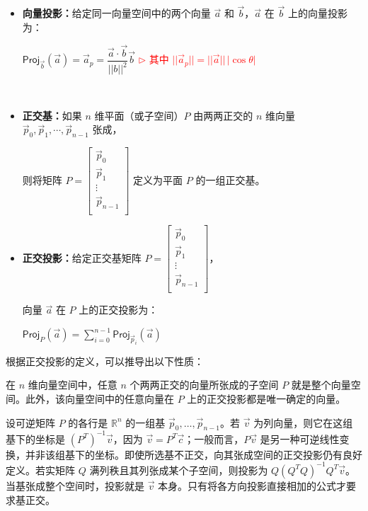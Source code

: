 \begin{tcolorbox}[title={\textbf{\tboxdef{\ref*{subsec:projection}} 向量投影与正交投影}}]

\begin{itemize}

\item \textbf{向量投影：}给定同一向量空间中的两个向量 $\vec{a}$ 和 $\vec{b}$，$\vec{a}$ 在 $\vec{b}$ 上的向量投影为：

$\textsf{Proj}_{\vec{b}}(\vec{a}) = \vec{a}_p  = \dfrac{\vec{a} \cdot \vec{b}}{||b||^2} \vec{b}$ \textcolor{red}{ $\rhd$ 其中 $||\vec{a}_p|| = ||\vec{a}||\,|\cos \theta|$}

$ $

\item \textbf{正交基：}如果 $n$ 维平面（或子空间）$P$ 由两两正交的 $n$ 维向量 $\vec{p}_0, \vec{p}_1, \cdots, \vec{p}_{n-1}$ 张成，

则将矩阵 $P = \begin{bmatrix} 
\vec{p}_0\\
\vec{p}_1\\
\vdots\\
\vec{p}_{n-1}\\
\end{bmatrix}
$
定义为平面 $P$ 的一组正交基。


\item \textbf{正交投影：}给定正交基矩阵 $P = \begin{bmatrix} 
\vec{p}_0\\
\vec{p}_1\\
\vdots\\
\vec{p}_{n-1}\\
\end{bmatrix}
$，

向量 $\vec{a}$ 在 $P$ 上的正交投影为：

$\textsf{Proj}_P(\vec{a}) = \sum\limits_{i=0}^{n-1} \textsf{Proj}_{\vec{p}_i}(\vec{a})$



\end{itemize}


\end{tcolorbox}


根据正交投影的定义，可以推导出以下性质：

在 $n$ 维向量空间中，任意 $n$ 个两两正交的向量所张成的子空间 $P$ 就是整个向量空间。此外，该向量空间中的任意向量在 $P$ 上的正交投影都是唯一确定的向量。

设可逆矩阵 $P$ 的各行是 $\mathbb R^n$ 的一组基 $\vec p_0,\ldots,\vec p_{n-1}$。若 $\vec v$ 为列向量，则它在这组基下的坐标是 $(P^T)^{-1}\vec v$，因为 $\vec v=P^T\vec c$；一般而言，$P\vec v$ 是另一种可逆线性变换，并非该组基下的坐标。即使所选基不正交，向其张成空间的正交投影仍有良好定义。若实矩阵 $Q$ 满列秩且其列张成某个子空间，则投影为 $Q(Q^TQ)^{-1}Q^T\vec v$。当基张成整个空间时，投影就是 $\vec v$ 本身。只有将各方向投影直接相加的公式才要求基正交。

